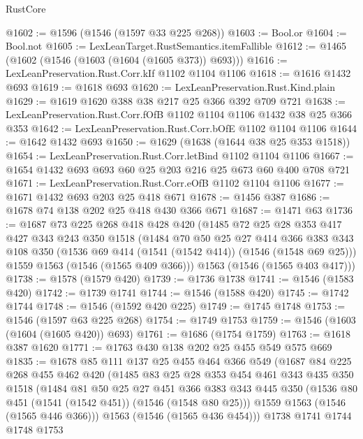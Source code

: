 \begin{lexlean}{RustCore}
\begin{coremodule}
@1602 := @1596 (@1546 (@1597 @33 @225 @268))
@1603 := Bool.or
@1604 := Bool.not
@1605 := LexLeanTarget.RustSemantics.itemFallible
@1612 := @1465 (@1602 (@1546 (@1603 (@1604 (@1605 @373)) @693)))
@1616 := LexLeanPreservation.Rust.Corr.kIf @1102 @1104 @1106
@1618 := @1616 @1432 @693
@1619 := @1618 @693
@1620 := LexLeanPreservation.Rust.Kind.plain
@1629 := @1619 @1620 @388 @38 @217 @25 @366 @392 @709 @721
@1638 := LexLeanPreservation.Rust.Corr.fOfB @1102 @1104 @1106 @1432 @38 @25 @366 @353
@1642 := LexLeanPreservation.Rust.Corr.bOfE @1102 @1104 @1106
@1644 := @1642 @1432 @693
@1650 := @1629 (@1638 (@1644 @38 @25 @353 @1518))
@1654 := LexLeanPreservation.Rust.Corr.letBind @1102 @1104 @1106
@1667 := @1654 @1432 @693 @693 @60 @25 @203 @216 @25 @673 @60 @400 @708 @721
@1671 := LexLeanPreservation.Rust.Corr.eOfB @1102 @1104 @1106
@1677 := @1671 @1432 @693 @203 @25 @418 @671
@1678 := @1456 @387
@1686 := @1678 @74 @138 @202 @25 @418 @430 @366 @671
@1687 := @1471 @63
@1736 := @1687
    @73
    @225
    @268
    @418
    @428
    @420
    (@1485
      @72
      @25
      @28
      @353
      @417
      @427
      @343
      @243
      @350
      @1518
      (@1484
        @70
        @50
        @25
        @27
        @414
        @366
        @383
        @343
        @108
        @350
        (@1536 @69 @414 (@1541 (@1542 @414)) (@1546 (@1548 @69 @25)))
        @1559
        @1563
        (@1546 (@1565 @409 @366)))
      @1563
      (@1546 (@1565 @403 @417)))
@1738 := @1578 (@1579 @420)
@1739 := @1736 @1738
@1741 := @1546 (@1583 @420)
@1742 := @1739 @1741
@1744 := @1546 (@1588 @420)
@1745 := @1742 @1744
@1748 := @1546 (@1592 @420 @225)
@1749 := @1745 @1748
@1753 := @1546 (@1597 @63 @225 @268)
@1754 := @1749 @1753
@1759 := @1546 (@1603 (@1604 (@1605 @420)) @693)
@1761 := @1686 (@1754 @1759)
@1763 := @1618 @387 @1620
@1771 := @1763 @430 @138 @202 @25 @455 @549 @575 @669
@1835 := @1678
    @85
    @111
    @137
    @25
    @455
    @464
    @366
    @549
    (@1687
      @84
      @225
      @268
      @455
      @462
      @420
      (@1485
        @83
        @25
        @28
        @353
        @454
        @461
        @343
        @435
        @350
        @1518
        (@1484
          @81
          @50
          @25
          @27
          @451
          @366
          @383
          @343
          @445
          @350
          (@1536 @80 @451 (@1541 (@1542 @451)) (@1546 (@1548 @80 @25)))
          @1559
          @1563
          (@1546 (@1565 @446 @366)))
        @1563
        (@1546 (@1565 @436 @454)))
      @1738
      @1741
      @1744
      @1748
      @1753

\end{coremodule}
\end{lexlean}
